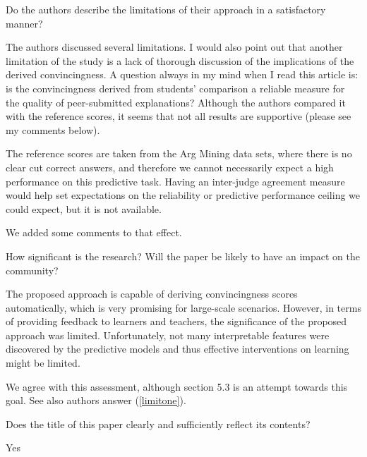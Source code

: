 \documentclass[notitlepage,12pt]{article}
\newcounter{answ}
\begin{document}
    \begin{revcomment}{Do the authors describe the limitations of their approach in a satisfactory manner?}

      The authors discussed several limitations. I would also point out that another limitation of the study is a lack of thorough discussion of the implications of the derived convincingness. A question always in my mind when I read this article is: is the convincingness derived from students’ comparison a reliable measure for the quality of peer-submitted explanations? Although the authors compared it with the reference scores, it seems that not all results are supportive (please see my comments below).

      \begin{authors}
        The reference scores are taken from the Arg Mining data sets, where there is no clear cut correct answers, and therefore we cannot necessarily expect a high performance on this predictive task.  Having an inter-judge agreement measure would help set expectations on the reliability or predictive performance ceiling we could expect, but it is not available.

        We added some comments to that effect.
      \end{authors}
    \end{revcomment}

    \begin{revcomment}{How significant is the research? Will the paper be likely to have an impact on the community?}

      The proposed approach is capable of deriving convincingness scores automatically, which is very promising for large-scale scenarios. However, in terms of providing feedback to learners and teachers, the significance of the proposed approach was limited. Unfortunately, not many interpretable features were discovered by the predictive models and thus effective interventions on learning might be limited.

      \begin{authors}
        We agree with this assessment, although section 5.3 is an attempt towards this goal.  See also authors answer (\ref{limitone}).
      \end{authors}
    \end{revcomment}

    \begin{revcomment}{Does the title of this paper clearly and sufficiently reflect its contents?}

    Yes
    \end{revcomment}
\end{document}
